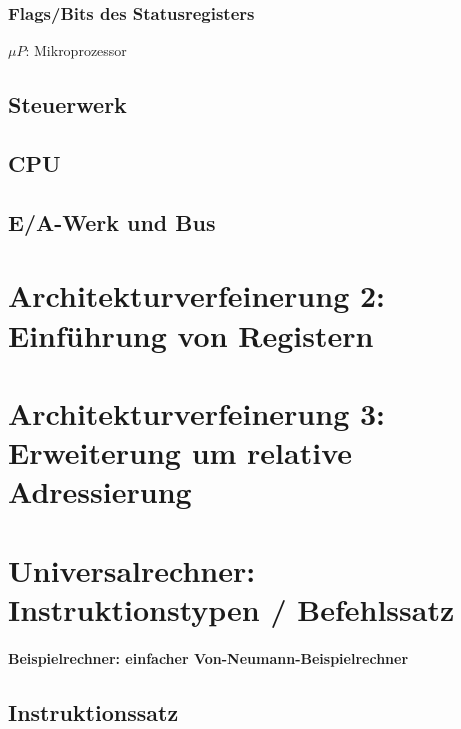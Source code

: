 \subsubsection{Flags/Bits des Statusregisters}
$\mu P$: Mikroprozessor
\subsection{Steuerwerk}
\subsection{CPU}
\subsection{E/A-Werk und Bus}

\section{Architekturverfeinerung 2: Einführung von Registern}

\section{Architekturverfeinerung 3: Erweiterung um relative Adressierung}

\section{Universalrechner: Instruktionstypen / Befehlssatz}

\paragraph{Beispielrechner: einfacher Von-Neumann-Beispielrechner}

\subsection{Instruktionssatz}

